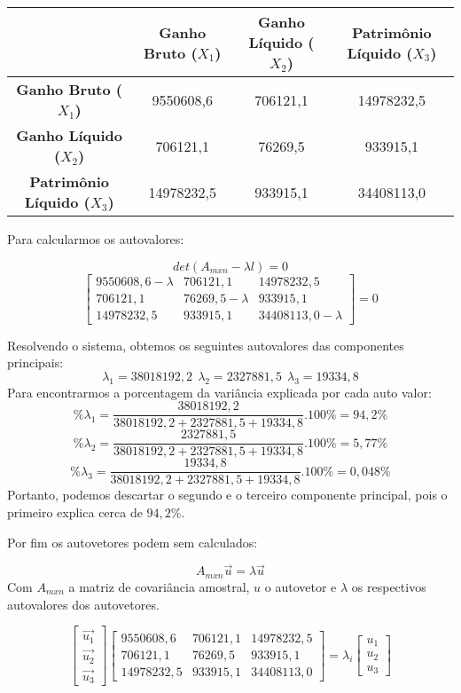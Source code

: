\documentclass[
  openany]{book}
\begin{document}
\begin{longtable}[]{@{}cccc@{}}
\toprule
& \textbf{Ganho Bruto (\(X_1\))} & \textbf{Ganho Líquido (\(X_2\))} & \textbf{Patrimônio Líquido (\(X_3\))}\tabularnewline
\midrule
\endhead
\textbf{Ganho Bruto (\(X_1\))} & 9550608,6 & 706121,1 & 14978232,5\tabularnewline
\textbf{Ganho Líquido (\(X_2\))} & 706121,1 & 76269,5 & 933915,1\tabularnewline
\textbf{Patrimônio Líquido (\(X_3\))} & 14978232,5 & 933915,1 & 34408113,0\tabularnewline
\bottomrule
\end{longtable}

Para calcularmos os autovalores:

\[det(A_{mxn}-\lambda l)=0\]
\[\begin{bmatrix}
9550608,6 -\lambda &706121,1 &14978232,5\\ 
706121,1 &76269,5-\lambda & 933915,1 \\
14978232,5&933915,1&34408113,0-\lambda
\end{bmatrix}=0\]

Resolvendo o sistema, obtemos os seguintes autovalores das componentes principais:
\[\lambda_1=38018192,2 \ \ \lambda_2=2327881,5 \ \ \lambda_3=19334,8\]
Para encontrarmos a porcentagem da variância explicada por cada auto valor:
\[\%\lambda_1=\frac{38018192,2}{38018192,2+2327881,5+19334,8}.100\%=94,2\% \] \[\%\lambda_2=\frac{2327881,5}{38018192,2+2327881,5+19334,8}.100\%=5,77\% \] \[\%\lambda_3=\frac{19334,8}{38018192,2+2327881,5+19334,8}.100\%=0,048\%\]
Portanto, podemos descartar o segundo e o terceiro componente principal, pois o primeiro explica cerca de \(94,2\%\).

Por fim os autovetores podem sem calculados:

\[A_{mxn}\vec{u}=\lambda \vec{u}\]
Com \(A_{mxn}\) a matriz de covariância amostral, \(u\) o autovetor e \(\lambda\) os respectivos autovalores dos autovetores.

\[\begin{bmatrix}
\vec{u_1}\\ \vec{u_2} \\ \vec{u_3}
\end{bmatrix}
\begin{bmatrix}
9550608,6  &706121,1 &14978232,5\\ 
706121,1 &76269,5 & 933915,1 \\
14978232,5&933915,1&34408113,0
\end{bmatrix}  = \lambda_i \begin{bmatrix}
u_1\\ u_2 \\ u_3
\end{bmatrix} \]
\end{document}
